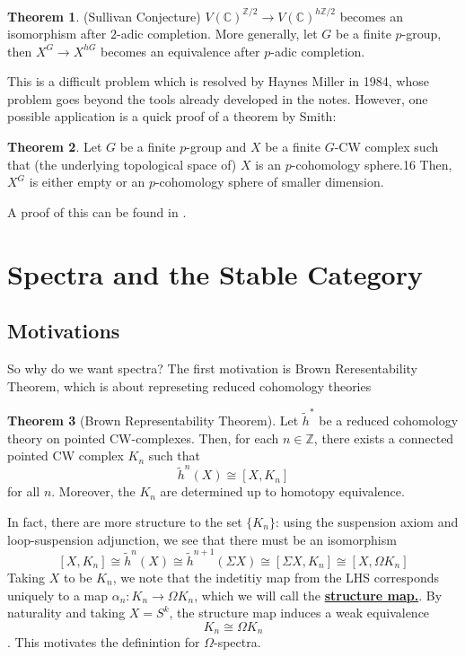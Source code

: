 \documentclass{article}
\theoremstyle{definition}
\newtheorem{theorem}{Theorem}[section] %
\begin{document}
\begin{tcolorbox}[colback=red!5!white,colframe=red!30!white]
\begin{theorem}
(Sullivan Conjecture) $V(\mathbb{C})^{\mathbb{Z}/2}\to V(\mathbb{C})^{h \mathbb{Z}/2}$ becomes an isomorphism after $2$-adic completion. More generally, let $G$ be a finite $p$-group, then $X^G\to X^{hG}$ becomes an equivalence after $p$-adic completion. 
\end{theorem}
\end{tcolorbox}
This is a difficult problem which is resolved by Haynes Miller in 1984, whose problem goes beyond the tools already developed in the notes. However, one possible application is a quick proof of a theorem by Smith: 

\begin{tcolorbox}[colback=red!5!white,colframe=red!30!white]
\begin{theorem}
    Let $G$ be a finite $p$-group and $X$ be a finite $G$-CW complex such that (the underlying topological space of) $X$ is an $p$-cohomology sphere.16 Then, $X^G$ is either empty or an $p$-cohomology sphere of smaller dimension.
\end{theorem}
\end{tcolorbox}
A proof of this can be found in \cite{ST}.







\section{Spectra and the Stable Category}
\subsection{Motivations}
So why do we want spectra? The first motivation is Brown Reresentability Theorem, which is about represeting reduced cohomology theories 

\begin{tcolorbox}[colback=red!5!white,colframe=red!30!white]
\begin{theorem}[Brown Representability Theorem]
Let $\tilde{h}^*$ be a reduced cohomology theory on pointed CW-complexes. Then, for each $n\in \mathbb{Z}$, there exists a connected pointed CW complex $K_n$ such that 
\[\tilde{h}^n(X)\cong [X,K_n]\]
for all $n$. Moreover, the $K_n$ are determined up to homotopy equivalence. 
\end{theorem}
\end{tcolorbox}
In fact, there are more structure to the set $\{K_n\}$: using the suspension axiom and loop-suspension adjunction, we see that there must be an isomorphism 
\[[X,K_n]\cong \tilde{h}^n(X)\cong \tilde{h}^{n+1}(\Sigma X)\cong [\Sigma X,K_n]\cong [X,\Omega K_n]\]
Taking $X$ to be $K_n$, we note that the indetitiy map from the LHS corresponds uniquely to a map $\alpha_n: K_n\to \Omega K_n$, which we will call the \underline{\textbf{structure map.}}. By naturality and taking $X=S^k$, the structure map induces a weak equivalence 
\[K_n\cong  \Omega K_n\]
. This motivates the definintion for $\Omega$-spectra. 
\end{document}
